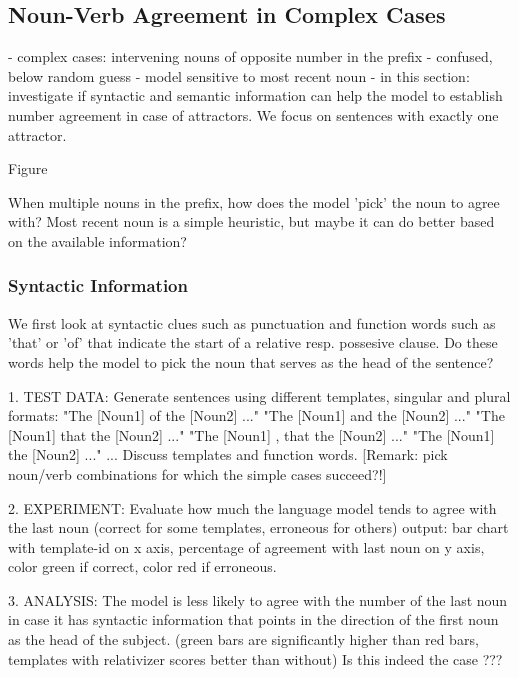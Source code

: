 \begin{multicols}{2}
 
\subsection{Noun-Verb Agreement in Complex Cases}

- complex cases: intervening nouns of opposite number in the prefix
- confused, below random guess 
- model sensitive to most recent noun \label{fig:2c}
- in this section: 
investigate if syntactic and semantic information
can help the model to establish number agreement
in case of attractors.
We focus on sentences with exactly one attractor.
 

Figure \label{fig:2c} 

When multiple nouns in the prefix, how does the model 'pick' the noun to agree with?
Most recent noun is a simple heuristic, but maybe it can do better based
on the available information?

\subsubsection{Syntactic Information}

We first look at syntactic clues such as punctuation
and function words such as 'that' or 'of'
that indicate the start of a relative resp. possesive
clause. Do these words help the model to pick
the noun that serves as the head of the sentence?

1. TEST DATA:
Generate sentences using different templates, singular and plural formats:
"The [Noun1] of the [Noun2] ..."
"The [Noun1] and the [Noun2] ..."
"The [Noun1] that the [Noun2] ..."
"The [Noun1] , that the [Noun2] ..."
"The [Noun1] the [Noun2] ..."
...
Discuss templates and function words.
[Remark: pick noun/verb combinations for which the simple cases succeed?!]

2. EXPERIMENT:
Evaluate how much the language model tends to agree with the last noun 
(correct for some templates, erroneous for others)
output: bar chart with template-id on x axis, percentage of agreement
with last noun on y axis, color green if correct, color red if erroneous.  

3. ANALYSIS:
The model is less likely to agree with the number of the 
last noun in case it has syntactic information
that points in the direction of the first noun as the head of the subject.
(green bars are significantly higher than red bars,
templates with relativizer scores better than without)
Is this indeed the case ???


\end{multicols}
